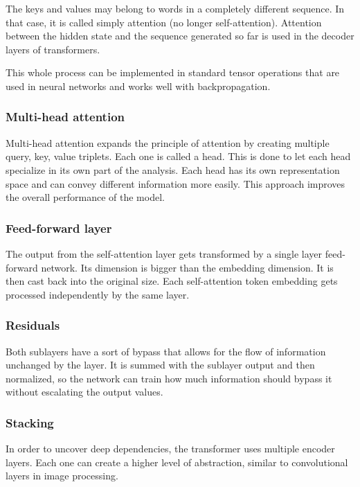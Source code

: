 \documentclass[
  printed, %
  color,   %
  table,   %
  oneside, %
  lof,     %
  lot,     %
]{fithesis3}
\begin{document}
\vspace{0.5cm}
{\parindent=0pt
    The keys and values may belong to words in a completely different sequence. In that case, it is called simply attention (no longer self-attention). Attention between the hidden state and the sequence generated so far is used in the decoder layers of transformers.
}

\vspace{0.5cm}
{\parindent=0pt
This whole process can be implemented in standard tensor operations that are used in neural networks and works well with backpropagation.
}

\subsubsection{Multi-head attention}
Multi-head attention expands the principle of attention by creating multiple query, key, value triplets. Each one is called a head. This is done to let each head specialize in its own part of the analysis. Each head has its own representation space and can convey different information more easily. This approach improves the overall performance of the model.

\subsubsection{Feed-forward layer}
The output from the self-attention layer gets transformed by a single layer feed-forward network. Its dimension is bigger than the embedding dimension. It is then cast back into the original size. Each self-attention token embedding gets processed independently by the same layer. 

\subsubsection{Residuals}
Both sublayers have a sort of bypass that allows for the flow of information unchanged by the layer. It is summed with the sublayer output and then normalized, so the network can train how much information should bypass it without escalating the output values.

\subsubsection{Stacking}
In order to uncover deep dependencies, the transformer uses multiple encoder layers. Each one can create a higher level of abstraction, similar to convolutional layers in image processing.
\end{document}
